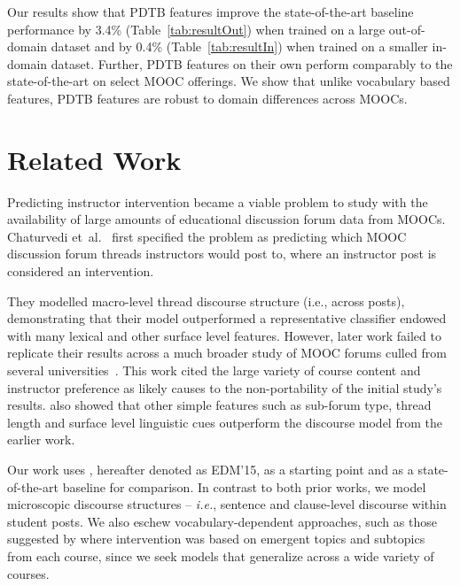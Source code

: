 \documentclass[letterpaper]{article}
\begin{document}
Our results show that PDTB features improve the state-of-the-art baseline 
performance by 3.4\% (Table~\ref{tab:resultOut}) when trained on a large 
out-of-domain dataset and by 0.4\% (Table~\ref{tab:resultIn}) when trained on a  
smaller in-domain dataset. Further, PDTB features on 
their own perform comparably to the state-of-the-art on select MOOC offerings. 
We show that unlike vocabulary based features, PDTB features are robust to 
domain differences across MOOCs.

\section{Related Work} 
\label{sect:related}

Predicting instructor intervention became a viable problem to
study with the availability of large amounts of educational discussion 
forum data from MOOCs. Chaturvedi et~al.~ 
first specified the problem as predicting which MOOC discussion forum threads 
instructors would post to, where an instructor post is considered 
an intervention.

They modelled macro-level thread discourse structure (i.e.,
across posts), demonstrating that their model outperformed a
representative classifier endowed with many lexical and other
surface level features. However, later work failed to replicate their 
results across a much broader study of MOOC forums culled from several 
universities~\cite{chandrasekaran2015learning}. This work cited the 
large variety of course content and instructor preference as likely 
causes to the non-portability of the initial study's results. 
\citeauthor{chandrasekaran2015learning} also showed that other simple 
features such as sub-forum type, thread length and surface level 
linguistic cues outperform the discourse model from the earlier work.

Our work uses \citeauthor{chandrasekaran2015learning}
, hereafter denoted as EDM'15,
as a starting point and as a state-of-the-art baseline for comparison.
In contrast to both prior works, we model microscopic discourse
structures -- {\it i.e.}, sentence and clause-level discourse within
student posts. We also eschew vocabulary-dependent approaches, such as
those suggested by \citeauthor{ramesh2015} 
where intervention was based on emergent topics and subtopics 
from each course, since we seek models that generalize across a wide
variety of courses.
\end{document}
